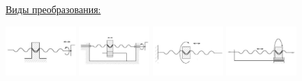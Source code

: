 \documentclass{article}
\begin{document}
\underline{Виды преобразования:} 

\includegraphics[width = 0.2\textwidth]{23_1}
\includegraphics[width = 0.2\textwidth]{23_2}
\includegraphics[width = 0.2\textwidth]{23_3}
\includegraphics[width = 0.2\textwidth]{23_4}
\end{document}
